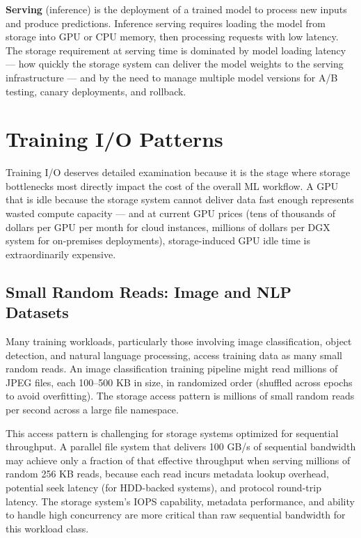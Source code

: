 \textbf{Serving} (inference) is the deployment of a trained model to process new inputs and produce predictions. Inference serving requires loading the model from storage into GPU or CPU memory, then processing requests with low latency. The storage requirement at serving time is dominated by model loading latency --- how quickly the storage system can deliver the model weights to the serving infrastructure --- and by the need to manage multiple model versions for A/B testing, canary deployments, and rollback.

\section{Training I/O Patterns}

Training I/O deserves detailed examination because it is the stage where storage bottlenecks most directly impact the cost of the overall ML workflow. A GPU that is idle because the storage system cannot deliver data fast enough represents wasted compute capacity --- and at current GPU prices (tens of thousands of dollars per GPU per month for cloud instances, millions of dollars per DGX system for on-premises deployments), storage-induced GPU idle time is extraordinarily expensive.

\subsection{Small Random Reads: Image and NLP Datasets}

Many training workloads, particularly those involving image classification, object detection, and natural language processing, access training data as many small random reads. An image classification training pipeline might read millions of JPEG files, each 100--500 KB in size, in randomized order (shuffled across epochs to avoid overfitting). The storage access pattern is millions of small random reads per second across a large file namespace.

This access pattern is challenging for storage systems optimized for sequential throughput. A parallel file system that delivers 100 GB/s of sequential bandwidth may achieve only a fraction of that effective throughput when serving millions of random 256 KB reads, because each read incurs metadata lookup overhead, potential seek latency (for HDD-backed systems), and protocol round-trip latency. The storage system's IOPS capability, metadata performance, and ability to handle high concurrency are more critical than raw sequential bandwidth for this workload class.

